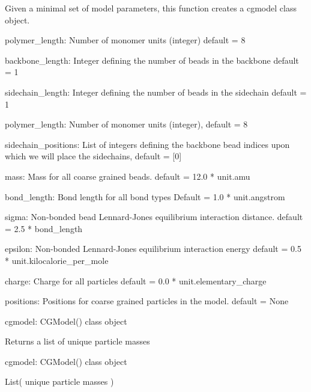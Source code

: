 \documentclass[letterpaper,12pt,english,openany,oneside]{sphinxmanual}
\begin{document}

\begin{fulllineitems}
Given a minimal set of model parameters, this function creates a cgmodel class object.

polymer\_length: Number of monomer units (integer)
default = 8

backbone\_length: Integer defining the number of beads in the backbone
default = 1

sidechain\_length: Integer defining the number of beads in the sidechain
default = 1

polymer\_length: Number of monomer units (integer), default = 8

sidechain\_positions: List of integers defining the backbone
bead indices upon which we will place the sidechains,
default = {[}0{]}

mass: Mass for all coarse grained beads.
default = 12.0 * unit.amu

bond\_length: Bond length for all bond types
Default = 1.0 * unit.angstrom

sigma: Non-bonded bead Lennard-Jones equilibrium interaction distance.
default = 2.5 * bond\_length

epsilon: Non-bonded Lennard-Jones equilibrium interaction energy
default = 0.5 * unit.kilocalorie\_per\_mole

charge: Charge for all particles
default = 0.0 * unit.elementary\_charge

positions: Positions for coarse grained particles in the model.
default = None

cgmodel: CGModel() class object

\end{fulllineitems}


\begin{fulllineitems}
\label{\detokenize{cg_model:cg_model.cgmodel.get_all_particle_masses}}
Returns a list of unique particle masses

cgmodel: CGModel() class object

List( unique particle masses )

\end{fulllineitems}
\end{document}
